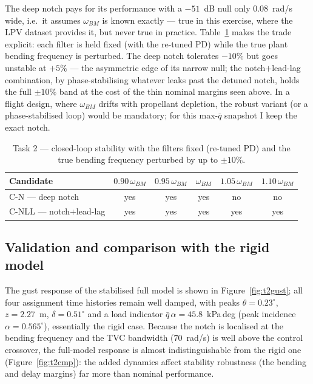 \documentclass[../main.tex]{subfiles}
\begin{document}
The deep notch pays for its performance with a $-51$~dB null only $0.08$~rad/s
wide, i.e.\ it assumes $\omega_{BM}$ is known exactly --- true in this exercise,
where the LPV dataset provides it, but never true in practice.
Table~\ref{tab:wbm} makes the trade explicit: each filter is held fixed (with the
re-tuned PD) while the true plant bending frequency is perturbed. The deep notch
tolerates $-10\%$ but goes unstable at $+5\%$ --- the asymmetric edge of its
narrow null; the notch$+$lead-lag combination, by phase-stabilising whatever
leaks past the detuned notch, holds the full $\pm 10\%$ band at the cost of the
thin nominal margins seen above. In a flight design, where $\omega_{BM}$ drifts
with propellant depletion, the robust variant (or a phase-stabilised loop) would
be mandatory; for this max-$\bar q$ snapshot I keep the exact notch.

\begin{table}[H]
\centering
\caption{Task 2 --- closed-loop stability with the filters fixed (re-tuned PD)
and the true bending frequency perturbed by up to $\pm 10\%$.}
\label{tab:wbm}
\begin{tabular}{lccccc}
\toprule
Candidate & $0.90\,\omega_{BM}$ & $0.95\,\omega_{BM}$ & $\omega_{BM}$ & $1.05\,\omega_{BM}$ & $1.10\,\omega_{BM}$ \\
\midrule
C-N --- deep notch        & yes & yes & yes & no  & no \\
C-NLL --- notch+lead-lag  & yes & yes & yes & yes & yes \\
\bottomrule
\end{tabular}
\end{table}

\subsection{Validation and comparison with the rigid model}

The gust response of the stabilised full model is shown in
Figure~\ref{fig:t2gust}; all four assignment time histories remain well damped,
with peaks $\theta = 0.23^\circ$, $z = 2.27$~m, $\delta = 0.51^\circ$ and a
load indicator $\bar q\,\alpha = 45.8$~kPa\,deg (peak incidence
$\alpha = 0.565^\circ$), essentially the rigid case. Because the notch is localised at the bending frequency and the TVC
bandwidth ($70$~rad/s) is well above the control crossover, the full-model
response is almost indistinguishable from the rigid one
(Figure~\ref{fig:t2cmp}): the added dynamics affect stability robustness (the
bending and delay margins) far more than nominal performance.
\end{document}
